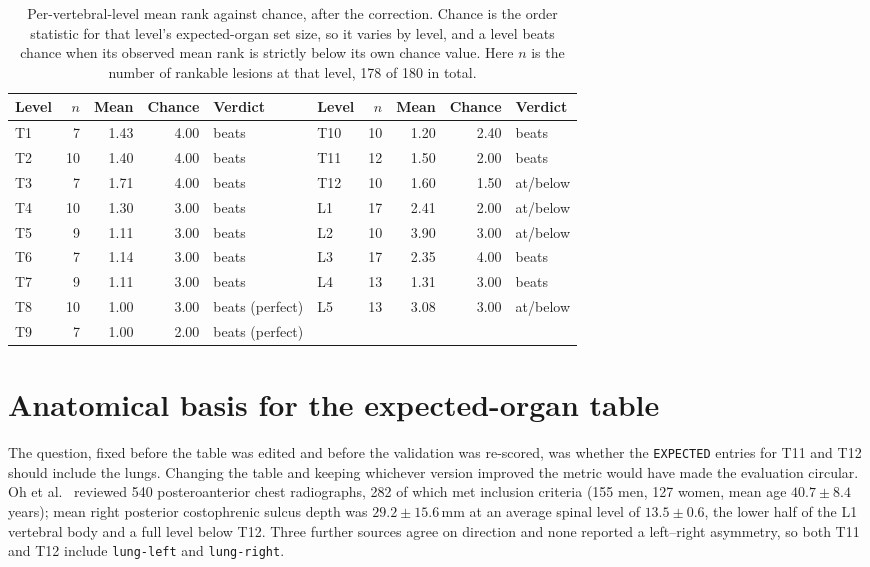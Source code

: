 \documentclass[10pt]{article}
\newcommand{\org}[1]{\texttt{#1}}
\newcommand{\code}[1]{\texttt{#1}}
\begin{document}
\begin{table}[H]
\centering
\small
\caption{Per-vertebral-level mean rank against chance, after the correction.
Chance is the order statistic for that level's expected-organ set size, so it
varies by level, and a level beats chance when its observed mean rank is strictly
below its own chance value. Here $n$ is the number of rankable lesions at that
level, 178 of 180 in total.}
\label{tab:perlevel}
\begin{tabular}{lrrrl@{\hskip 2.5em}lrrrl}
\toprule
Level & $n$ & Mean & Chance & Verdict & Level & $n$ & Mean & Chance & Verdict \\
\midrule
T1  &  7 & 1.43 & 4.00 & beats           & T10 & 10 & 1.20 & 2.40 & beats \\
T2  & 10 & 1.40 & 4.00 & beats           & T11 & 12 & 1.50 & 2.00 & beats \\
T3  &  7 & 1.71 & 4.00 & beats           & T12 & 10 & 1.60 & 1.50 & at/below \\
T4  & 10 & 1.30 & 3.00 & beats           & L1  & 17 & 2.41 & 2.00 & at/below \\
T5  &  9 & 1.11 & 3.00 & beats           & L2  & 10 & 3.90 & 3.00 & at/below \\
T6  &  7 & 1.14 & 3.00 & beats           & L3  & 17 & 2.35 & 4.00 & beats \\
T7  &  9 & 1.11 & 3.00 & beats           & L4  & 13 & 1.31 & 3.00 & beats \\
T8  & 10 & 1.00 & 3.00 & beats (perfect) & L5  & 13 & 3.08 & 3.00 & at/below \\
T9  &  7 & 1.00 & 2.00 & beats (perfect) &     &    &      &      & \\
\bottomrule
\end{tabular}
\end{table}

\section{Anatomical basis for the expected-organ table}
\label{app:anatomy}

The question, fixed before the table was edited and before the validation was
re-scored, was whether the \code{EXPECTED} entries for T11 and T12 should include
the lungs. Changing the table and keeping whichever version improved the metric
would have made the evaluation circular. Oh et al.\
\cite{oh2009retrodiaphragmatic} reviewed 540 posteroanterior chest radiographs,
282 of which met inclusion criteria (155 men, 127 women, mean age
$40.7\pm8.4$ years); mean right posterior costophrenic sulcus depth was
$29.2\pm15.6$\,mm at an average spinal level of $13.5\pm0.6$, the lower half of
the L1 vertebral body and a full level below T12. Three further sources agree on
direction and none reported a left--right asymmetry, so both T11 and T12 include
\org{lung-left} and \org{lung-right}.
\end{document}
